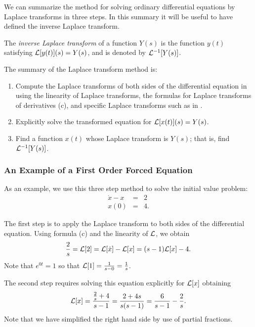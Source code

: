 We can summarize the method for solving ordinary differential equations by
Laplace transforms in three steps.  In this summary it will be useful to 
have defined the inverse Laplace transform.
\begin{Def}  \label{D:invLaplace}
The {\em inverse Laplace transform\/} of a function $Y(s)$ is the function 
$y(t)$ satisfying ${\cal L}[y(t)](s) = Y(s)$, and is denoted by  
${\cal L}^{-1}[Y(s)]$.
\end{Def}

The summary of the Laplace transform method is: 
\begin{enumerate}
\item	Compute the Laplace transforms of both sides of the differential 
equation in  using the linearity of Laplace transforms, the 
formulas for Laplace transforms of derivatives (c), and specific 
Laplace transforms such as in .
\item	Explicitly solve the transformed equation for 
${\cal L}[x(t)](s)=Y(s)$.
\item	Find a function $x(t)$ whose Laplace transform is $Y(s)$; that is, 
find ${\cal L}^{-1}[Y(s)]$.
\end{enumerate}

\subsubsection*{An Example of a First Order Forced Equation}

As an example, we use this three step method to solve the initial value 
problem:
\begin{equation}  \label{eq:dxx2}
\begin{array}{rcl}
\dot x - x & = & 2\\
  x(0) & = & 4.
\end{array}
\end{equation}

The first step is to apply the Laplace transform to both sides of the 
differential equation.  Using formula (c) and the linearity of 
${\cal L}$, we obtain
\[
\frac{2}{s} = {\cal L}[2] = {\cal L}[\dot x]-{\cal L}[x] = 
(s-1){\cal L}[x]-4.
\]
Note that $e^{0t}=1$ so that ${\cal L}[1] = \frac{1}{s-0}=\frac{1}{s}$.

The second step requires solving this equation explicitly for ${\cal L}[x]$
obtaining
\begin{equation}  \label{eq:Lapdxx2}
{\cal L}[x] = \frac{\frac{2}{s}+4}{s-1} = \frac{2+4s}{s(s-1)}
= \frac{6}{s-1} - \frac{2}{s}.
\end{equation}
Note that we have simplified the right hand side by use of partial fractions.

